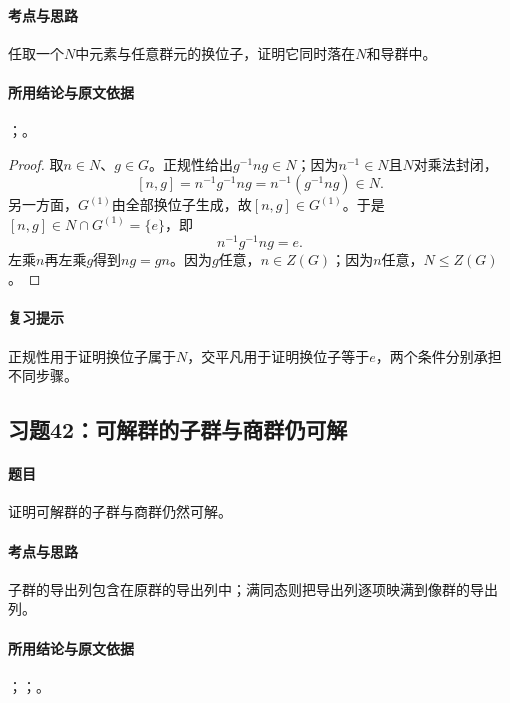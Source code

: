 \paragraph{考点与思路}
任取一个$N$中元素与任意群元的换位子，证明它同时落在$N$和导群中。

\paragraph{所用结论与原文依据}
；。


\begin{proof}
取$n\in N$、$g\in G$。正规性给出$g^{-1}ng\in N$；因为$n^{-1}\in N$且$N$对乘法封闭，
\[
[n,g]=n^{-1}g^{-1}ng=n^{-1}(g^{-1}ng)\in N.
\]
另一方面，$G^{(1)}$由全部换位子生成，故$[n,g]\in G^{(1)}$。于是$[n,g]\in N\cap G^{(1)}=\{e\}$，即
\[
n^{-1}g^{-1}ng=e.
\]
左乘$n$再左乘$g$得到$ng=gn$。因为$g$任意，$n\in Z(G)$；因为$n$任意，$N\le Z(G)$。
\end{proof}

\paragraph{复习提示}
正规性用于证明换位子属于$N$，交平凡用于证明换位子等于$e$，两个条件分别承担不同步骤。


\subsection{习题42：\texorpdfstring{可解群的子群与商群仍可解}{可解群的子群与商群仍可解}}
\label{ex:2:42}

\paragraph{题目}
证明可解群的子群与商群仍然可解。

\paragraph{考点与思路}
子群的导出列包含在原群的导出列中；满同态则把导出列逐项映满到像群的导出列。

\paragraph{所用结论与原文依据}
；；。

